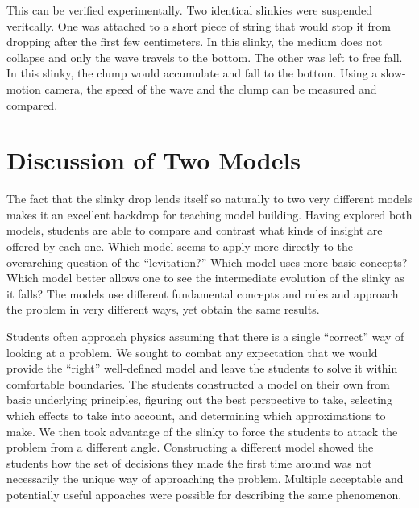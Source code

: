 \documentclass[aps,pre,10pt,superscriptaddress,showpacs,amsmath,amssymb,nofootinbib]{revtex4-1}
\begin{document}
This can be verified experimentally. Two identical slinkies were suspended veritcally. One was attached
to a short piece of string that would stop it from dropping after the first few centimeters. In this slinky,
the medium does not collapse and only the wave travels to the bottom. The other was left to free fall. In this
slinky, the clump would accumulate and fall to the bottom. Using a slow-motion camera, the speed of the wave 
and the clump can be measured and compared.



\section{Discussion of Two Models}
\label{sec:discussion}

The fact that the slinky drop lends itself so naturally to two very different models
makes it an excellent backdrop for teaching model building. Having explored both
models, students are able to compare and contrast what kinds of insight are
offered by each one. Which model seems to apply more directly to the overarching
question of the ``levitation?'' Which model uses more basic concepts? Which model
better allows one to see the intermediate evolution of the slinky as it falls?
The models use different fundamental concepts and rules and approach
the problem in very different ways, yet obtain the same results.

Students often approach physics assuming that there is a single ``correct'' way
of looking at a problem. We sought to combat any expectation that we would
provide the ``right'' well-defined model and leave the students to solve it within
comfortable boundaries.
The students constructed a model on their own from basic underlying
principles, figuring out the best perspective to take, selecting which effects
to take into account, and determining which approximations to make.
We then took advantage of the slinky to force the students to attack the problem
from a different angle. Constructing a different model showed the students
how the set of decisions they made the first time around was not necessarily
the unique way of approaching the problem. Multiple acceptable and potentially
useful appoaches were possible for describing the same phenomenon.
\end{document}
